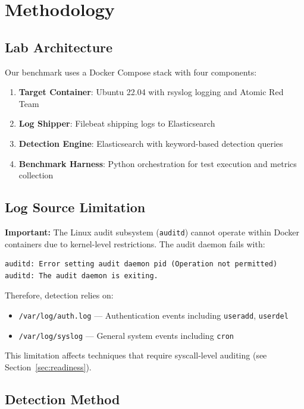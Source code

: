 \documentclass[11pt,a4paper]{article}
\begin{document}
\section{Methodology}

\subsection{Lab Architecture}

Our benchmark uses a Docker Compose stack with four components:

\begin{enumerate}
    \item \textbf{Target Container}: Ubuntu 22.04 with rsyslog logging and Atomic Red Team
    \item \textbf{Log Shipper}: Filebeat shipping logs to Elasticsearch
    \item \textbf{Detection Engine}: Elasticsearch with keyword-based detection queries
    \item \textbf{Benchmark Harness}: Python orchestration for test execution and metrics collection
\end{enumerate}

\subsection{Log Source Limitation}

\textbf{Important:} The Linux audit subsystem (\texttt{auditd}) cannot operate within Docker containers due to kernel-level restrictions. The audit daemon fails with:

\begin{verbatim}
auditd: Error setting audit daemon pid (Operation not permitted)
auditd: The audit daemon is exiting.
\end{verbatim}

Therefore, detection relies on:
\begin{itemize}
    \item \texttt{/var/log/auth.log} --- Authentication events including \texttt{useradd}, \texttt{userdel}
    \item \texttt{/var/log/syslog} --- General system events including \texttt{cron}
\end{itemize}

This limitation affects techniques that require syscall-level auditing (see Section~\ref{sec:readiness}).

\subsection{Detection Method}
\end{document}

